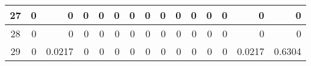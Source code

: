 \begin{table}[hb!]
\begin{adjustbox}{width = \textwidth, center}
\begin{tabular}{|c|r|r|r|r|r|r|r|r|r|r|r|r|r|r|}
        \rowcolor[HTML]{FFFFFF} 
        \cellcolor[HTML]{CFE2F3}27                                  & 0                                              & 0                                              & 0                                              & 0                                              & 0                                              & 0                                              & 0                                              & 0                                               & 0                                               & 0                                               & 0                                               & 0                                               & \cellcolor[HTML]{D9D2E9}0                                                       & \cellcolor[HTML]{D9D2E9}0                                                             \\ \hline
        \rowcolor[HTML]{FFFFFF} 
        \cellcolor[HTML]{CFE2F3}28                                  & 0                                              & 0                                              & 0                                              & 0                                              & 0                                              & 0                                              & 0                                              & 0                                               & 0                                               & 0                                               & 0                                               & 0                                               & \cellcolor[HTML]{D9D2E9}0                                                       & \cellcolor[HTML]{D9D2E9}0                                                             \\ \hline
        \rowcolor[HTML]{FFFFFF} 
        \cellcolor[HTML]{CFE2F3}29                                  & 0                                              & \cellcolor[HTML]{C7E9D8}0.0217                 & 0                                              & 0                                              & 0                                              & 0                                              & 0                                              & 0                                               & 0                                               & 0                                               & 0                                               & 0                                               & \cellcolor[HTML]{D9D2E9}0.0217                                                  & \cellcolor[HTML]{D9D2E9}0.6304                                                        \\ \hline

\end{tabular}
\end{adjustbox}
\end{table}
